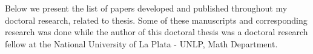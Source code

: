 \documentclass[12pt]{article}
\begin{document}




Below we present the list of papers developed and published throughout my doctoral research, related to thesis. Some of these manuscripts and corresponding research was done while the author of this doctoral thesis was a doctoral research fellow at the National University of La Plata - UNLP, Math Department.
\end{document}
